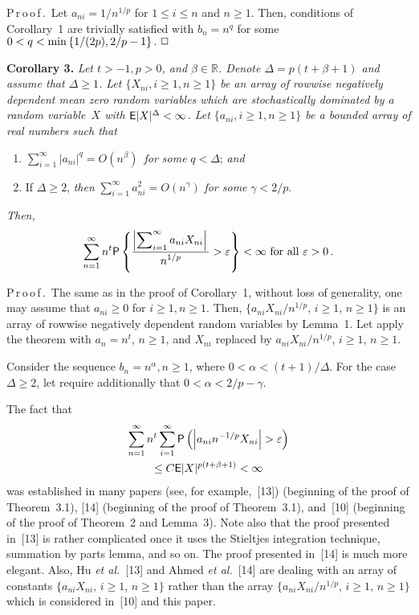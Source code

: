\begin{multicols}{2}
\noindent 
P\,r\,o\,o\,f\,.\ Let $a_{ni}=1/n^{1/p}$ for $1\le i\le n$ and $n\ge 1.$ 
Then, conditions of Corollary~1 are
trivially satisfied with $b_n= n^q$ for some $0<q <\min\left\{{1}/({2p}), {2}/{p}-1\right\}.\hfill~\Box$

\medskip

\noindent 
\textbf{Corollary 3.} \textit{Let $t>-1, p>0$, and $\beta \in {\mathbb R}$. Denote $\Delta=p(t+\beta+1)$ and
assume that $\Delta\ge 1$. Let $\{X_{ni}, i\ge 1, n\ge 1\}$ be an array of rowwise negatively dependent  mean
zero random variables which are stochastically dominated by a random variable~$X$ with 
${\sf E}|X|^{\Delta}<\infty$.
Let $\{a_{ni}, i\ge 1, n\ge 1\}$ be a bounded array of real numbers such that}
\begin{enumerate}[(1)]
\item  $ \sum\limits_{i=1}^\infty |a_{ni}|^q =O(n^\beta)$\ \textit{for some} $q< \Delta$; \textit{and}
\item  If $\Delta \ge 2$, \textit{then} $\sum\limits_{i=1}^\infty a_{ni}^2=O(n^\gamma )$
\textit{for some} $\gamma<2/p$.
\end{enumerate}
\textit{Then,}
$$ 
\sum\limits_{n=1}^\infty n^t {\sf P}\left\{ 
\displaystyle\frac{\displaystyle \left|\sum\nolimits_{i=1}^\infty a_{ni}X_{ni}\right|\mathstrut}{\displaystyle n^{1/p}\mathstrut}>\varepsilon \right\}
<\infty \mbox{ for all } \varepsilon>0\,.
$$

\noindent 
P\,r\,o\,o\,f\,.\ The same as in the proof of Corollary~1, without loss of generality, 
one may assume that
$a_{ni}\ge 0$ for $i\ge 1, n\ge 1.$ Then, $\{a_{ni}X_{ni}/n^{1/p}$, $i\ge 1$, $n\ge 1\}$ 
is an array of rowwise
negatively dependent random variables by Lemma~1. 
Let apply the theorem with $a_n=n^t$, $n\ge 1$, and $X_{ni}$
replaced by $a_{ni}X_{ni}/n^{1/p}$, $i\ge 1$, $n\ge 1$.

Consider the sequence $b_n=n^{\alpha}, n\ge 1$, 
where $0<\alpha <(t+1)/\Delta$. For the case $\Delta\ge 2$,
let require additionally that $0<\alpha< 2/p - \gamma$.

The fact that
\begin{multline*}
\sum\limits_{n=1}^\infty n^t \sum\limits_{i=1}^\infty 
{\sf P}\left( \left\vert a_{ni}n^{-1/p} X_{ni}\right\vert>
\varepsilon\right)\\
\le C{\sf E}|X|^{p(t+\beta+1)}
< \infty 
\end{multline*}
was established in many papers (see, for example,~[13]) 
(beginning of the proof of Theorem~3.1),
[14] (beginning of the proof of Theorem~3.1), and~[10] 
(beginning of the proof of Theorem~2 and Lemma~3). 
Note also  that the proof presented in~[13] is rather complicated
once it uses the Stieltjes integration technique, summation by parts lemma, and so on. 
The proof presented in~[14] is much more elegant. Also, Hu {\it et al.}~[13] and 
Ahmed {\it et al.}~[14] 
are dealing with an array of constants $\{ a_{ni}X_{ni}$, $i\ge 1$, $n\ge 1\}$ rather 
than the array $\{a_{ni}X_{ni}/n^{1/p}$, $i\ge 1$, $n\ge 1\}$ which is considered in~[10] 
and this paper.


\end{multicols}
